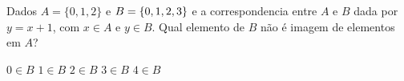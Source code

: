 Dados $A=\{ 0,1,2 \}$ e $B=\{ 0, 1, 2,\\ 3\}$ e a correspondencia entre $A$ e $B$ dada por $y=x+1$, com $x\in A$ e $y\in B$. Qual elemento de $B$ não é imagem de elementos em $A$?

$0\in B$
$1\in B$
$2\in B$
$3\in B$
$4\in B$



